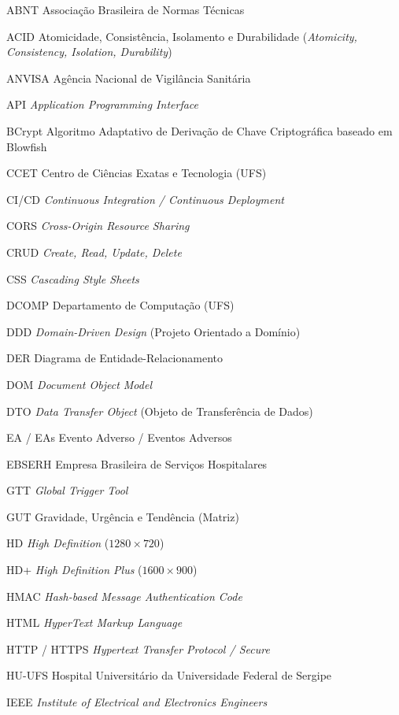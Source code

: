 \begin{siglas}
  \item[ABNT] Associação Brasileira de Normas Técnicas
  \item[ACID] Atomicidade, Consistência, Isolamento e Durabilidade (\textit{Atomicity, Consistency, Isolation, Durability})
  \item[ANVISA] Agência Nacional de Vigilância Sanitária
  \item[API] \textit{Application Programming Interface}
  \item[BCrypt] Algoritmo Adaptativo de Derivação de Chave Criptográfica baseado em Blowfish
  \item[CCET] Centro de Ciências Exatas e Tecnologia (UFS)
  \item[CI/CD] \textit{Continuous Integration / Continuous Deployment}
  \item[CORS] \textit{Cross-Origin Resource Sharing}
  \item[CRUD] \textit{Create, Read, Update, Delete}
  \item[CSS] \textit{Cascading Style Sheets}
  \item[DCOMP] Departamento de Computação (UFS)
  \item[DDD] \textit{Domain-Driven Design} (Projeto Orientado a Domínio)
  \item[DER] Diagrama de Entidade-Relacionamento
  \item[DOM] \textit{Document Object Model}
  \item[DTO] \textit{Data Transfer Object} (Objeto de Transferência de Dados)
  \item[EA / EAs] Evento Adverso / Eventos Adversos
  \item[EBSERH] Empresa Brasileira de Serviços Hospitalares
  \item[GTT] \textit{Global Trigger Tool}
  \item[GUT] Gravidade, Urgência e Tendência (Matriz)
  \item[HD] \textit{High Definition} ($1280 \times 720$)
  \item[HD+] \textit{High Definition Plus} ($1600 \times 900$)
  \item[HMAC] \textit{Hash-based Message Authentication Code}
  \item[HTML] \textit{HyperText Markup Language}
  \item[HTTP / HTTPS] \textit{Hypertext Transfer Protocol / Secure}
  \item[HU-UFS] Hospital Universitário da Universidade Federal de Sergipe
  \item[IEEE] \textit{Institute of Electrical and Electronics Engineers}

\end{siglas}
